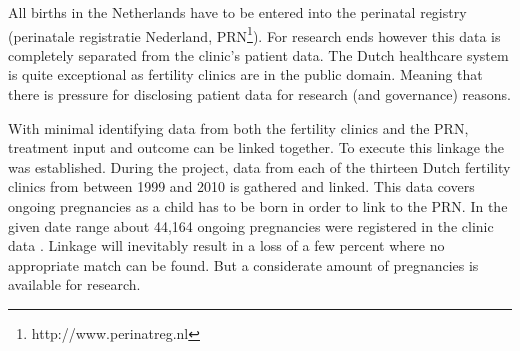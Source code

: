 All births in the Netherlands have to be entered into the perinatal registry (perinatale registratie Nederland, PRN\footnote{http://www.perinatreg.nl}).
For research ends however this data is completely separated from the clinic's patient data.
The Dutch healthcare system is quite exceptional as fertility clinics are in the public domain.
Meaning that there is pressure for disclosing patient data for research (and governance) reasons.

With minimal identifying data from both the fertility clinics and the PRN, treatment input and outcome can be linked together.
To execute this linkage the \project{} was established.
During the project, data from each of the thirteen Dutch fertility clinics from between 1999 and 2010 is gathered and linked.
This data covers ongoing pregnancies as a child has to be born in order to link to the PRN.
In the given date range about 44,164 ongoing pregnancies were registered in the clinic data \cite{ivfReportNVOG}.
Linkage will inevitably result in a loss of a few percent where no appropriate match can be found.
But a considerate amount of pregnancies is available for research.